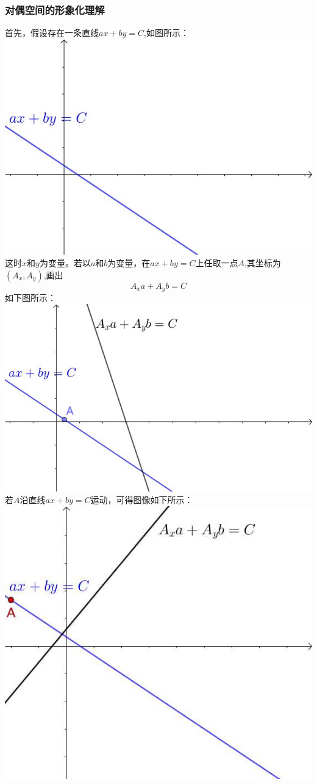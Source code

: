 \documentclass[UTF8]{ctexart}
\begin{document}
\subsubsection{对偶空间的形象化理解}
首先，假设存在一条直线$ax + by = C$,如图所示：\newline
\includegraphics[width=.8\textwidth]{dual1.jpg} \newline
这时$x$和$y$为变量。若以$a$和$b$为变量，在$ax + by = C$上任取一点$A$,其坐标为$(A_x,A_y)$,画出$$A_xa + A_yb = C$$ 如下图所示：\newline
\includegraphics[width=.8\textwidth]{dual2.jpg} \newline
若$A$沿直线$ax + by = C$运动，可得图像如下所示：\newline
\includegraphics[width=.8\textwidth]{dual3.jpg} \newline
\end{document}

